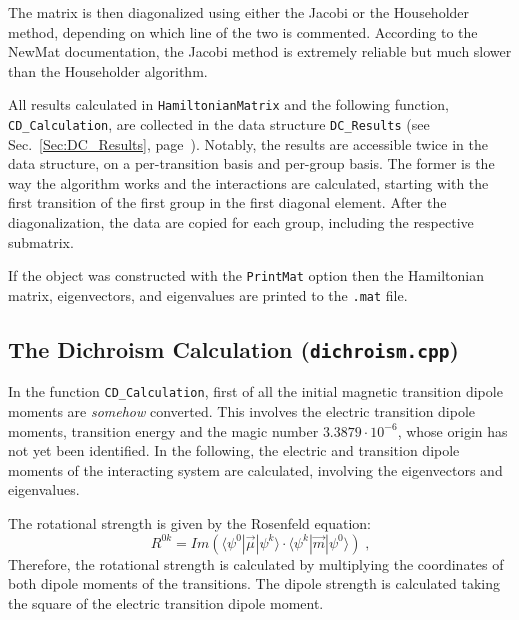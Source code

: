 \documentclass[11pt, letterpaper]{article}
\begin{document}
The matrix is then diagonalized using either the Jacobi or the Householder method, depending on which line of the two is commented. According to the NewMat documentation, the Jacobi method is extremely reliable but much slower than the Householder algorithm.

All results calculated in \verb'HamiltonianMatrix' and the following function, \verb'CD_Calculation', are collected in the data structure \verb'DC_Results' (see Sec.~\ref{Sec:DC_Results}, page~\pageref{Sec:DC_Results}). Notably, the results are accessible twice in the data structure, on a per-transition basis and per-group basis. The former is the way the algorithm works and the interactions are calculated, starting with the first transition of the first group in the first diagonal element. After the diagonalization, the data are copied for each group, including the respective submatrix.

If the object was constructed with the \verb'PrintMat' option then the Hamiltonian matrix, eigenvectors, and eigenvalues are printed to the \verb'.mat' file.



\pagebreak

\subsection{The Dichroism Calculation (\texttt{dichroism.cpp})}

In the function \verb'CD_Calculation', first of all the initial magnetic transition dipole moments are \emph{somehow} converted. This involves the electric transition dipole moments, transition energy and the magic number $3.3879\cdot10^{-6}$, whose origin has not yet been identified. In the following, the electric and transition dipole moments of the interacting system are calculated, involving the eigenvectors and eigenvalues.

The rotational strength is given by the Rosenfeld equation:
%
\begin{equation}
	R^{0k} = Im ( \langle \psi^0 | \vec{\mu} | \psi^k \rangle 
				\cdot
				\langle \psi^k | \vec{m} | \psi^0 \rangle) \;\textrm{,}
\label{Eqn:Rosenfeld}
\end{equation}
%
Therefore, the rotational strength is calculated by multiplying the coordinates of both dipole moments of the transitions. The dipole strength is calculated taking the square of the electric transition dipole moment.
\end{document}
